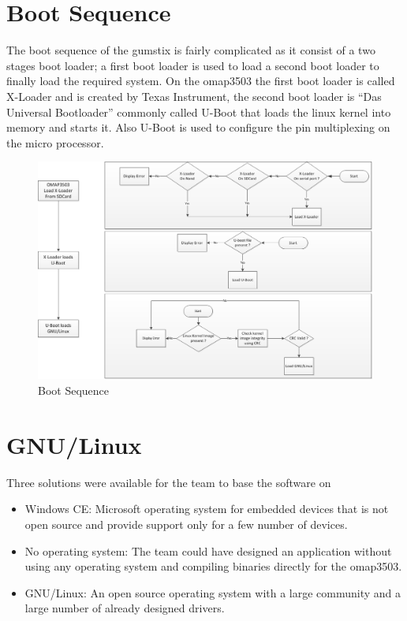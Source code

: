 \documentclass[11pt]{report} %
\begin{document}
	\section{Boot Sequence}
	The boot sequence of the gumstix is fairly complicated as it consist of a two 
	stages boot loader; a first boot loader is used to load a second boot loader to
	finally load the required system. On the omap3503 the first boot loader is
	called X-Loader and is created by Texas Instrument, the second boot loader
	is ``Das Universal Bootloader'' commonly called U-Boot that loads the linux
	kernel into memory and starts it. Also U-Boot is used to configure the pin
	multiplexing on the micro processor.
	\begin{figure}[H]
		\centering
		\includegraphics[scale=0.50]{images/boot.png}
		\caption{Boot Sequence}\label{fig:boot_diagram}
	\end{figure}

	\section{GNU/Linux}
	Three solutions were available for the team to base the software on
	\begin{itemize}
		\item Windows CE: Microsoft operating system for embedded devices that is not
		open source and provide support only for a few number of devices.
		\item No operating system: The team could have designed an application without
		using any operating system and compiling binaries directly for the omap3503.
		\item GNU/Linux: An open source operating system with a large community and a
		large number of already designed drivers.
	\end{itemize}
\end{document}
